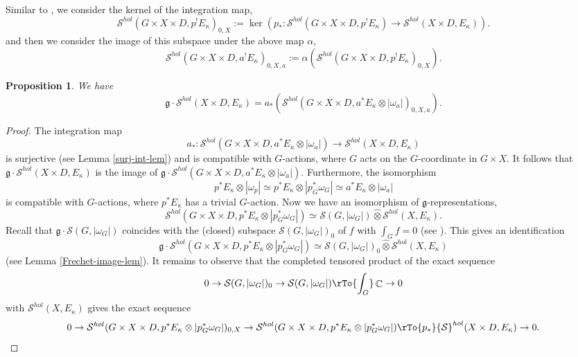 \documentclass[12pt,reqno]{amsart}
\DeclareMathOperator\C{\mathbb C}
\newtheorem{prop}[theorem]{Proposition}
\theoremstyle{definition}
\theoremstyle{remark}
\numberwithin{equation}{section}
\newcommand{\sspan}{\operatorname{span}}
\newcommand{\ot}{\otimes}
\renewcommand{\SS}{{\mathcal S}}
\newcommand{\om}{\omega}
\renewcommand{\a}{\alpha}
\newcommand{\fg}{{\mathfrak g}}
\begin{document}
Similar to \cite{AG-sm-tr}, we consider the kernel of the integration map,
$$\SS^{hol}(G\times X\times D,p^!E_{\kappa})_{0,X}:=\ker(p_*:\SS^{hol}(G\times X\times D,p^!E_{\kappa})\to \SS^{hol}(X\times D,E_{\kappa})).$$
and then we consider the image of this subspace under the above map $\a$,
$$\SS^{hol}(G\times X\times D,a^!E_{\kappa})_{0,X,a}:=\a(\SS^{hol}(G\times X\times D,p^!E_{\kappa})_{0,X}).$$


\begin{prop}\label{coinv-descr-prop} 
We have
$$\fg\cdot \SS^{hol}(X\times D,E_{\kappa})=a_*(\SS^{hol}(G\times X\times D,a^*E_{\kappa}\ot|\om_a|)_{0,X,a}).$$
\end{prop}

\begin{proof}
The integration map 
$$a_*:\SS^{hol}(G\times X\times D,a^*E_{\kappa}\ot |\om_a|)\to \SS^{hol}(X\times D,E_{\kappa})$$
is surjective (see Lemma \ref{surj-int-lem}) and is compatible with $G$-actions, where $G$ acts on the $G$-coordinate in $G\times X$.
It follows that $\fg\cdot \SS^{hol}(X\times D,E_{\kappa})$ is the image of
$\fg\cdot \SS^{hol}(G\times X\times D,a^*E_{\kappa}\ot|\om_a|)$.
Furthermore, the isomorphism
$$p^*E_{\kappa}\ot |\om_p|\simeq p^*E_{\kappa}\ot |p_G^*\om_G|\simeq a^*E_{\kappa}\ot |\om_a|$$
is compatible with $G$-actions, where $p^*E_{\kappa}$ has a trivial $G$-action.
Now we have an isomorphism of $\fg$-representations,
$$\SS^{hol}(G\times X\times D,p^*E_{\kappa}\ot |p_G^*\om_G|)\simeq \SS(G,|\om_G|)\hat{\ot} \SS^{hol}(X,E_{\kappa}).$$
Recall that $\fg\cdot \SS(G,|\om_G|)$ coincides with the (closed) subspace $\SS(G,|\om_G|)_0$ of $f$ with $\int_G f=0$
(see \cite{AG-sm-tr}).
This gives an identification
$$\fg\cdot \SS^{hol}(G\times X\times D,p^*E_{\kappa}\ot |p_G^*\om_G|)\simeq \SS(G,|\om_G|)_0\hat{\ot} \SS^{hol}(X,E_{\kappa})$$
(see Lemma \ref{Frechet-image-lem}). 
It remains to observe that the completed tensored product of the exact sequence
$$0\to \SS(G,|\om_G|)_0\to \SS(G,|\om_G|)\rTo{\int_G} \C\to 0$$
with $\SS^{hol}(X,E_{\kappa})$ gives the exact sequence
$$0\to \SS^{hol}(G\times X\times D,p^*E_{\kappa}\ot |p_G^*\om_G|)_{0,X}\to \SS^{hol}(G\times X\times D,p^*E_{\kappa}\ot |p_G^*\om_G|)\rTo{p_*}
\SS^{hol}(X\times D,E_{\kappa})\to 0.$$
\end{proof}
\end{document}
